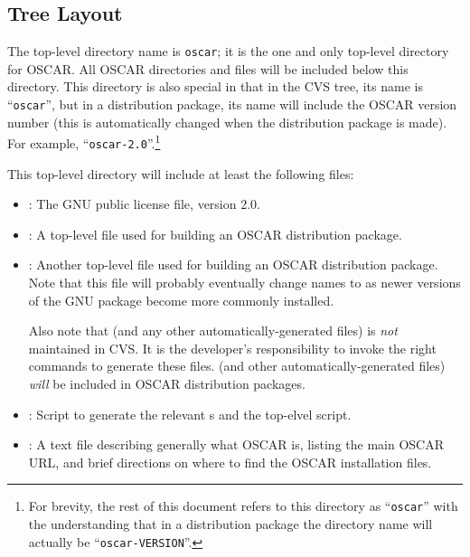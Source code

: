 \subsection{Tree Layout}

The top-level directory name is {\tt oscar}; it is the one and only
top-level directory for OSCAR.  All OSCAR directories and files will
be included below this directory.  This directory is also special in
that in the CVS tree, its name is ``{\tt oscar}'', but in a
distribution package, its name will include the OSCAR version number
(this is automatically changed when the distribution package is made).
For example, ``{\tt oscar-2.0}''.\footnote{For brevity, the rest of
  this document refers to this directory as ``{\tt oscar}'' with the
  understanding that in a distribution package the directory name will
  actually be ``{\tt oscar-VERSION}''.}

This top-level directory will include at least the following files:

\begin{itemize}
\item {}: The GNU public license file, version 2.0.
  
\item {}: A top-level file used for building an OSCAR
  distribution package.
  
\item {}: Another top-level file used for building an
  OSCAR distribution package.  Note that this file will probably
  eventually change names to  as newer versions of
  the GNU  package become more commonly installed.
  
  Also note that  (and any other
  automatically-generated files) is {\em not} maintained in CVS.  It
  is the developer's responsibility to invoke the right commands to
  generate these files.   (and other
  automatically-generated files) {\em will} be included in OSCAR
  distribution packages.
  
\item {}: Script to generate the relevant
  s and the top-elvel  script.
  
\item {}: A text file describing generally what OSCAR is,
  listing the main OSCAR URL, and brief directions on where to find
  the OSCAR installation files.
\end{itemize}

